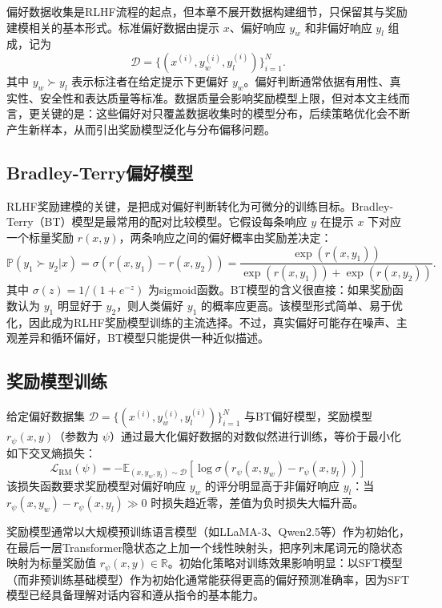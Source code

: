 偏好数据收集是RLHF流程的起点，但本章不展开数据构建细节，只保留其与奖励建模相关的基本形式。标准偏好数据由提示 $x$、偏好响应 $y_w$ 和非偏好响应 $y_l$ 组成，记为
\begin{equation}
    \mathcal{D} = \{(x^{(i)}, y_w^{(i)}, y_l^{(i)})\}_{i=1}^N.
\end{equation}
其中 $y_w \succ y_l$ 表示标注者在给定提示下更偏好 $y_w$。偏好判断通常依据有用性、真实性、安全性和表达质量等标准。数据质量会影响奖励模型上限，但对本文主线而言，更关键的是：这些偏好对只覆盖数据收集时的模型分布，后续策略优化会不断产生新样本，从而引出奖励模型泛化与分布偏移问题。


\subsection{Bradley-Terry偏好模型}

RLHF奖励建模的关键，是把成对偏好判断转化为可微分的训练目标。Bradley-Terry（BT）模型\cite{bradley1952rank}是最常用的配对比较模型。它假设每条响应 $y$ 在提示 $x$ 下对应一个标量奖励 $r(x,y)$，两条响应之间的偏好概率由奖励差决定：
\begin{equation}
    \mathbb{P}(y_1 \succ y_2 | x) = \sigma\left(r(x, y_1) - r(x, y_2)\right) = \frac{\exp(r(x,y_1))}{\exp(r(x,y_1)) + \exp(r(x,y_2))}.
    \label{eq:bt_model}
\end{equation}
其中 $\sigma(z) = 1/(1+e^{-z})$ 为sigmoid函数。BT模型的含义很直接：如果奖励函数认为 $y_1$ 明显好于 $y_2$，则人类偏好 $y_1$ 的概率应更高。该模型形式简单、易于优化，因此成为RLHF奖励模型训练的主流选择。不过，真实偏好可能存在噪声、主观差异和循环偏好，BT模型只能提供一种近似描述。

\subsection{奖励模型训练}

给定偏好数据集 $\mathcal{D} = \{(x^{(i)}, y_w^{(i)}, y_l^{(i)})\}_{i=1}^N$ 与BT偏好模型，奖励模型 $r_\psi(x,y)$（参数为 $\psi$）通过最大化偏好数据的对数似然进行训练，等价于最小化如下交叉熵损失：
\begin{equation}
    \mathcal{L}_{\text{RM}}(\psi) = -\mathbb{E}_{(x, y_w, y_l) \sim \mathcal{D}}\left[\log \sigma\left(r_\psi(x, y_w) - r_\psi(x, y_l)\right)\right]
    \label{eq:rm_loss}
\end{equation}
该损失函数要求奖励模型对偏好响应 $y_w$ 的评分明显高于非偏好响应 $y_l$：当 $r_\psi(x,y_w) - r_\psi(x,y_l) \gg 0$ 时损失趋近零，差值为负时损失大幅升高。

奖励模型通常以大规模预训练语言模型（如LLaMA-3\cite{dubey2024llama3}、Qwen2.5等）作为初始化，在最后一层Transformer隐状态之上加一个线性映射头，把序列末尾词元的隐状态映射为标量奖励值 $r_\psi(x,y) \in \mathbb{R}$\cite{ziegler2019fine}。初始化策略对训练效果影响明显：以SFT模型（而非预训练基础模型）作为初始化通常能获得更高的偏好预测准确率，因为SFT模型已经具备理解对话内容和遵从指令的基本能力\cite{ouyang2022training}。

